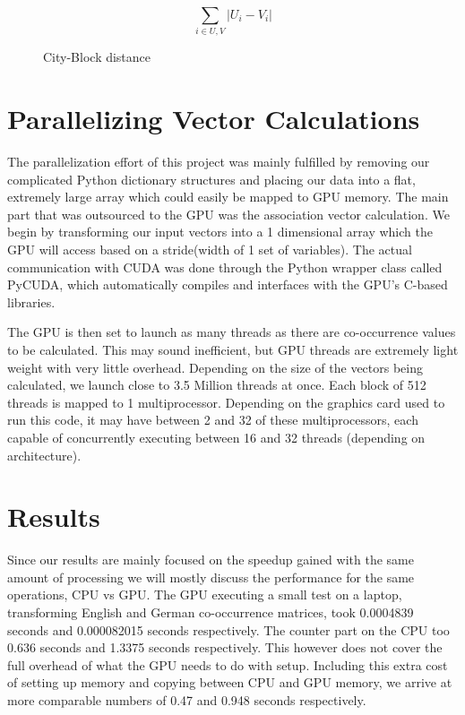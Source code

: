 \documentclass[12pt]{article}
\begin{document}
\begin{figure}
$$\sum_{i\in U,V} |U_i - V_i| $$
\caption{City-Block distance}
  \label{cityblock}
\end{figure}

\section{Parallelizing Vector Calculations}

The parallelization effort of this project was mainly fulfilled by removing our complicated Python dictionary structures and placing our data into a flat, extremely large array which could easily be mapped to GPU memory. The main part that was outsourced to the GPU was the association vector calculation. We begin by transforming our input vectors into a 1 dimensional array which the GPU will access based on a stride(width of 1 set of variables). The actual communication with CUDA was done through the Python wrapper class called PyCUDA, which automatically compiles and interfaces with the GPU's C-based libraries.

The GPU is then set to launch as many threads as there are co-occurrence values to be calculated. This may sound inefficient, but GPU threads are extremely light weight with very little overhead. Depending on the size of the vectors being calculated, we launch close to 3.5 Million threads at once. Each block of 512 threads is mapped to 1 multiprocessor. Depending on the graphics card used to run this code, it may have between 2 and 32 of these multiprocessors, each capable of concurrently executing between 16 and 32 threads (depending on architecture).

\section{Results}

Since our results are mainly focused on the speedup gained with the same amount of processing we will mostly discuss the performance for the same operations, CPU vs GPU. The GPU executing a small test on a laptop, transforming English and German co-occurrence matrices, took 0.0004839 seconds and 0.000082015 seconds respectively. The counter part on the CPU too 0.636 seconds and 1.3375 seconds respectively. This however does not cover the full overhead of what the GPU needs to do with setup. Including this extra cost of setting up memory and copying between CPU and GPU memory, we arrive at more comparable numbers of 0.47 and 0.948 seconds respectively.
\end{document}
